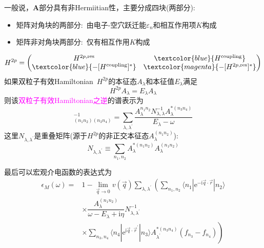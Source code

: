 {{{\vskip 3pt
一般说，$\mathbf{A}$部分具有非\textrm{Hermiitian}性，主要分成四块(两部分):
\begin{itemize}
	\item 矩阵对角块的两部分:~由电子-空穴跃迁能$\varepsilon_n$和相互作用项$K$构成
	\item 矩阵非对角块两部分:~仅有相互作用$K$构成
\end{itemize}
\begin{displaymath}
	H^{2p}=\begin{pmatrix}
		H^{2p,\mathrm{res}} &\textcolor{blue}{H^{\mathrm{coupling}}}\\	
		\textcolor{blue}{-[H^{\mathrm{coupling}}]^{\ast}} &\textcolor{magenta}{-[H^{2p,\mathrm{res}}]^{\ast}}
	\end{pmatrix}
\end{displaymath}
{\fontsize{5.0pt}{4.2pt}}
\vskip 3pt
如果双粒子有效\textrm{Hamiltonian}~$H^{2p}$的本征态$A_{\lambda}$和本征值$E_{\lambda}$满足
\begin{displaymath}
	H^{2p}A_{\lambda}=E_{\lambda}A_{\lambda}
\end{displaymath}
则该\textcolor{magenta}{双粒子有效\textrm{Hamiltonian}之逆}的谱表示为
\begin{displaymath}
	[H^{2p}-I\omega]_{(n_1n_2)(n_3n_4)}^{-1}=\sum_{\lambda,\lambda^{\prime}}\dfrac{A_{\lambda}^{n_1n_2}N_{\lambda,\lambda}^{-1}A_{\lambda}^{\ast(n_3n_4)}}{E_{\lambda}-\omega}
\end{displaymath}
这里$N_{\lambda,\lambda^{\prime}}$是重叠矩阵(源于$H^{2p}$的非正交本征态$A_{\lambda}^{(n_1n_2)}$):
\begin{displaymath}
	N_{\lambda,\lambda^{\prime}}\equiv\sum_{n_1,n_2}A_{\lambda}^{\ast(n_1n_2)}A_{\lambda}^{(n_1n_2)}
\end{displaymath} }}
最后可以宏观介电函数的表达式为
\begin{displaymath}
	\begin{aligned}
		\epsilon_M(\omega)=&1-\mathop{\mathrm{lim}}\limits_{\vec q\rightarrow0}v(\vec q)\sum_{\lambda,\lambda^{\prime}}\left(\sum_{n_1,n_2}\langle n_1|\mathrm{e}^{-\mathrm{i}\vec q\cdot\vec r}|n_2\rangle\right.\\
		&\times\dfrac{A_{\lambda}^{(n_1n_2)}}{\omega-E_{\lambda}+\mathrm{i}\eta}N_{\lambda,\lambda^{\prime}}^{-1}\\
		&\left.\times\sum_{n_3,n_4}\langle n_4|\mathrm{e}^{\mathrm{i}\vec q\cdot\vec r^{\prime}}|n_3\rangle A_{\lambda^{\prime}}^{\ast(n_3n_4)}(f_{n_3}-f_{n_4})\right)
	\end{aligned}
\end{displaymath}
}

